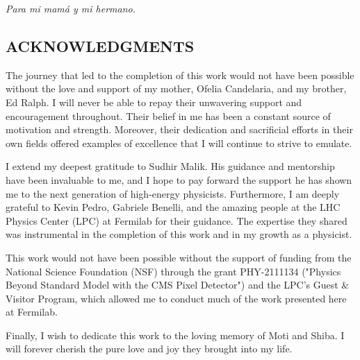 


\vspace*{2in}
\begin{center}
	\emph{Para mi mamá y mi hermano.}
\end{center}

\newpage


\vspace*{0.5in}
\begin{center}
	\section*{ACKNOWLEDGMENTS}
\end{center}



\noindent The journey that led to the completion of this work would not have been possible without the love and support of my mother, Ofelia Candelaria, and my brother, Ed Ralph. I will never be able to repay their unwavering support and encouragement throughout. Their belief in me has been a constant source of motivation and strength. Moreover, their dedication and sacrificial efforts in their own fields offered examples of excellence that I will continue to strive to emulate.

I extend my deepest gratitude to Sudhir Malik. His guidance and mentorship have been invaluable to me, and I hope to pay forward the support he has shown me to the next generation of high-energy physicists. Furthermore, I am deeply grateful to Kevin Pedro, Gabriele Benelli, and the amazing people at the LHC Physics Center (LPC) at Fermilab for their guidance. The expertise they shared was instrumental in the completion of this work and in my growth as a physicist.

This work would not have been possible without the support of funding from the National Science Foundation (NSF) through the grant PHY-2111134 ("Physics Beyond Standard Model with the CMS Pixel Detector") and the LPC's Guest \& Visitor Program, which allowed me to conduct much of the work presented here at Fermilab.

Finally, I wish to dedicate this work to the loving memory of Moti and Shiba. I will forever cherish the pure love and joy they brought into my life. 

